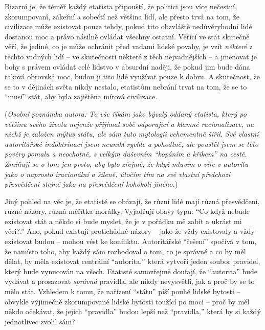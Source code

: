 \documentclass{book}
\begin{document}
Bizarní je, že téměř každý etatista připouští, že politici jsou více nečestní, zkorumpovaní, zákeřní a sobečtí než většina lidí, ale přesto trvá na tom, že civilizace může existovat pouze tehdy, pokud tito obzvláště nedůvěryhodní lidé dostanou moc a právo násilně ovládat všechny ostatní. Věřící ve stát skutečně věří, že jediné, co je může ochránit před vadami lidské povahy, je vzít \emph{některé} z těchto vadných lidí -- ve skutečnosti některé z těch nejvadnějších -- a jmenovat je bohy s právem ovládat celé lidstvo v absurdní naději, že pokud jim bude dána taková obrovská moc, budou ji tito lidé využívat pouze k dobru. A skutečnost, že se to v dějinách světa nikdy nestalo, etatistům nebrání trvat na tom, že se to \enquote{musí} stát, aby byla zajištěna mírová civilizace.

(\emph{Osobní poznámka autora: To vše říkám jako bývalý oddaný etatista, který po většinu svého života nejenže přijímal sobě odporující a klamné racionalizace, na nichž je založen mýtus státu, ale sám tuto mytologii vehementně šířil. Své vlastní autoritářské indoktrinaci jsem neunikl rychle a pohodlně, ale pouštěl jsem se této pověry pomalu a neochotně, s velkým duševním \enquote{kopáním a křikem} na cestě. Zmiňuji se o tom jen proto, aby bylo zřejmé, že když mluvím o víře v autoritu jako o naprosto iracionální a šílené, útočím tím na své vlastní předchozí přesvědčení stejně jako na přesvědčení kohokoli jiného.})

Jiný pohled na věc je, že etatisté se obávají, že různí lidé mají různá přesvědčení, různé názory, různá měřítka morálky. Vyjadřují obavy typu: \enquote{Co když nebude existovat stát a někdo si bude myslet, že je v pořádku mě zabít a ukrást mi věci?.} Ano, pokud existují protichůdné názory -- jako že vždy existovaly a vždy existovat budou -- mohou vést ke konfliktu. Autoritářské \enquote{řešení} spočívá v tom, že namísto toho, aby každý sám rozhodoval o tom, co je správné a co by měl dělat, by měla existovat centrální \enquote{autorita,} která vytvoří jeden soubor pravidel, který bude vynucován na všech. Etatisté samozřejmě doufají, že \enquote{autorita} bude vydávat a prosazovat \emph{správná} pravidla, ale nikdy nevysvětlí, jak a proč by se to mělo stát. Vzhledem k tomu, že nařízení \enquote{státu} píší pouhé lidské bytosti -- obvykle výjimečně zkorumpované lidské bytosti toužící po moci -- proč by měl někdo očekávat, že jejich \enquote{pravidla} budou lepší než \enquote{pravidla,} která by si každý jednotlivec zvolil sám?
\end{document}
